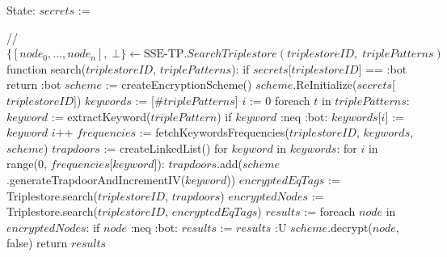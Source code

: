 State:
    $secrets$ := {}

// $\{[node_0, ..., node_n], \; \bot\} \leftarrow \textrm{SSE-TP}.SearchTriplestore(triplestoreID, \; triplePatterns)$
function search($triplestoreID$, $triplePatterns$):
    if $secrets$[$triplestoreID$] == :bot
        return :bot
    $scheme$ := createEncryptionScheme()
    $scheme$.ReInitialize($secrets$[$triplestoreID$])
    $keywords$ := [$\#triplePatterns$]
    $i$ := 0
    foreach $t$ in $triplePatterns$:
        $keyword$ := extractKeyword($triplePattern$) 
        if $keyword$ :neq :bot:
            $keywords$[$i$] := $keyword$
            $i$++
    $frequencies$ := fetchKeywordsFrequencies($triplestoreID$, $keywords$, $scheme$)
    $trapdoors$ := createLinkedList()
    for $keyword$ in $keywords$:
        for $i$ in range(0, $frequencies$[$keyword$]):
            $trapdoors$.add($scheme$.generateTrapdoorAndIncrementIV($keyword$))
    $encryptedEqTags$ := Triplestore.search($triplestoreID$, $trapdoors$)
    $encryptedNodes$ := Triplestore.search($triplestoreID$, $encryptedEqTags$)
    $results$ := {}
    foreach $node$ in $encryptedNodes$:
        if $node$ :neq :bot:
            $results$ := $results$ :U { $scheme$.decrypt($node$, false) }
    return $results$